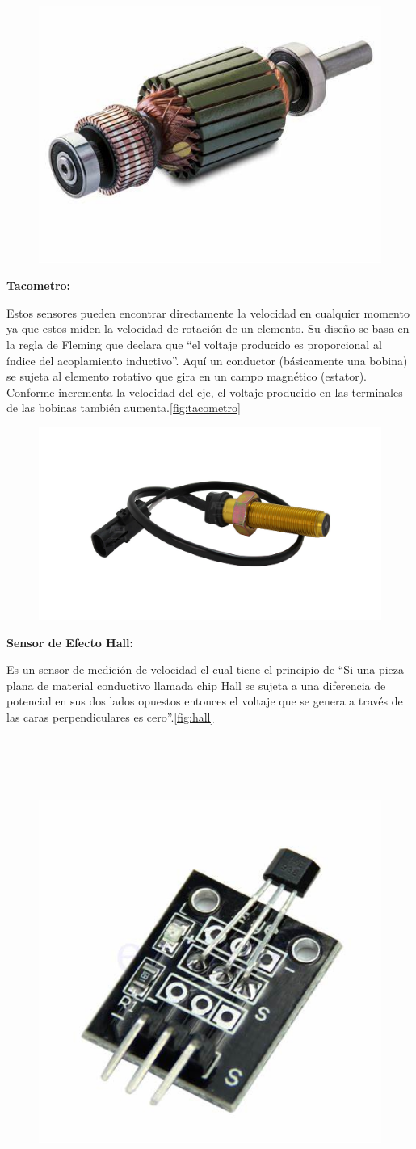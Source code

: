 \begin{figure}[h]
	\centering
	\includegraphics[width=0.2\linewidth, height=0.2\textheight]{img/OIP}
	\caption{}
	\label{fig:oip}
\end{figure}

\textbf{Tacometro:}

Estos sensores pueden encontrar directamente la velocidad en cualquier momento ya que estos miden la velocidad de rotación de un elemento. Su diseño se basa en la regla de Fleming que declara que “el voltaje producido es proporcional al índice del acoplamiento inductivo”. Aquí un conductor (básicamente una bobina) se sujeta al elemento rotativo que gira en un campo magnético (estator). Conforme incrementa la velocidad del eje, el voltaje producido en las terminales de las bobinas también aumenta.\autoref{fig:tacometro}


\begin{figure}[h]
	\centering
	\includegraphics[width=0.5\linewidth, height=0.3\textheight]{img/tacometro}
	\caption[Tacometro]{}
	\label{fig:tacometro}
\end{figure}

\textbf{Sensor de Efecto Hall:}

Es un sensor de medición de velocidad el cual tiene el principio de “Si una pieza plana de material conductivo llamada chip Hall se sujeta a una diferencia de potencial en sus dos lados opuestos entonces el voltaje que se genera a través de las caras perpendiculares es cero”.\autoref{fig:hall}\\\\\\\\\\


\begin{figure}[h]
	\centering
	\includegraphics[width=0.2\linewidth, height=0.2\textheight]{img/HALL}
	\caption{}
	\label{fig:hall}
\end{figure}




